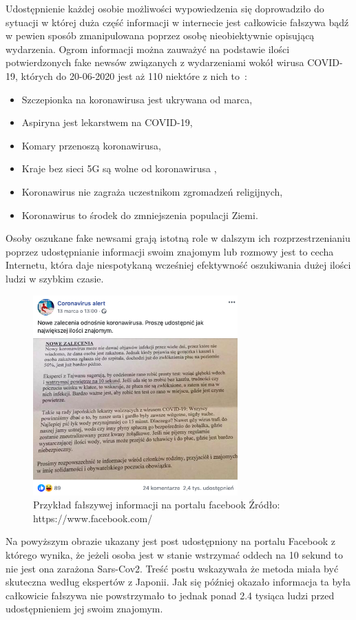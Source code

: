 Udostępnienie każdej osobie możliwości wypowiedzenia się doprowadziło do sytuacji w której duża część informacji w internecie
jest całkowicie fałszywa bądź w pewien sposób zmanipulowana poprzez osobę nieobiektywnie opisującą wydarzenia. Ogrom informacji
można zauważyć na podstawie ilości potwierdzonych fake newsów związanych z wydarzeniami wokół wirusa COVID-19, których do 
20-06-2020 jest aż 110 niektóre z nich to~\cite{Korona}:
\begin{itemize}
    \item Szczepionka na koronawirusa jest ukrywana od marca,
    \item Aspiryna jest lekarstwem na COVID-19,
    \item Komary przenoszą koronawirusa,
    \item Kraje bez sieci 5G są wolne od koronawirusa ,
    \item Koronawirus nie zagraża uczestnikom zgromadzeń religijnych,
    \item Koronawirus to środek do zmniejszenia populacji Ziemi.
\end{itemize}
Osoby oszukane fake newsami grają istotną role w dalszym ich rozprzestrzenianiu poprzez udostępnianie informacji swoim znajomym 
lub rozmowy jest to cecha Internetu, która daje niespotykaną wcześniej efektywność oszukiwania dużej ilości ludzi w szybkim
czasie. 
\begin{figure}[h!]
    \centering
    \includegraphics[width=0.7\textwidth]{./Img/cvfakenews.png}
    \caption{Przykład fałszywej informacji na portalu facebook Źródło: https://www.facebook.com/}
\end{figure}

Na powyższym obrazie ukazany jest post udostępniony na portalu Facebook z którego wynika, że jeżeli osoba jest w stanie wstrzymać 
oddech na 10 sekund to nie jest ona zarażona Sars-Cov2. Treść postu wskazywała że metoda miała być skuteczna według ekspertów 
z Japonii. Jak się później okazało informacja ta była całkowicie fałszywa nie powstrzymało to jednak ponad 2.4 tysiąca ludzi przed 
udostępnieniem jej swoim znajomym.~\cite{KoronaOddech} 


